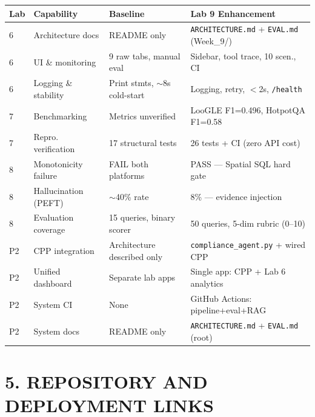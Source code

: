 \documentclass[11pt, letterpaper]{article}
\begin{document}
\begin{table}[h!]\centering
\begin{tabularx}{\textwidth}{@{} l l X X @{}}
\toprule
\textbf{Lab} & \textbf{Capability} & \textbf{Baseline} & \textbf{Lab 9 Enhancement} \\
\midrule
6 & Architecture docs & README only & \texttt{ARCHITECTURE.md} + \texttt{EVAL.md} (Week\_9/) \\
6 & UI \& monitoring & 9 raw tabs, manual eval & Sidebar, tool trace, 10 scen., CI \\
6 & Logging \& stability & Print stmts, $\sim$8s cold-start & Logging, retry, $<$2s, \texttt{/health} \\
7 & Benchmarking & Metrics unverified & LooGLE F1=0.496, HotpotQA F1=0.58 \\
7 & Repro. verification & 17 structural tests & 26 tests + CI (zero API cost) \\
8 & Monotonicity failure & FAIL both platforms & PASS — Spatial SQL hard gate \\
8 & Hallucination (PEFT) & $\sim$40\% rate & 8\% — evidence injection \\
8 & Evaluation coverage & 15 queries, binary scorer & 50 queries, 5-dim rubric (0--10) \\
P2 & CPP integration & Architecture described only & \texttt{compliance\_agent.py} + wired CPP \\
P2 & Unified dashboard & Separate lab apps & Single app: CPP + Lab 6 analytics \\
P2 & System CI & None & GitHub Actions: pipeline+eval+RAG \\
P2 & System docs & README only & \texttt{ARCHITECTURE.md} + \texttt{EVAL.md} (root) \\
\bottomrule
\end{tabularx}
\end{table}

\section{5. REPOSITORY AND DEPLOYMENT LINKS}
\end{document}
